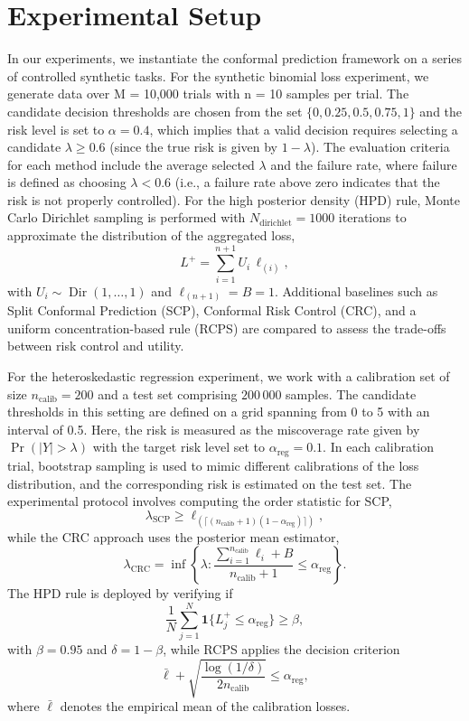 \documentclass{article}
\begin{document}
\section{Experimental Setup}
In our experiments, we instantiate the conformal prediction framework on a series of controlled synthetic tasks. For the synthetic binomial loss experiment, we generate data over M = 10,000 trials with n = 10 samples per trial. The candidate decision thresholds are chosen from the set \(\{0, 0.25, 0.5, 0.75, 1\}\) and the risk level is set to \(\alpha = 0.4\), which implies that a valid decision requires selecting a candidate \(\lambda \geq 0.6\) (since the true risk is given by \(1-\lambda\)). The evaluation criteria for each method include the average selected \(\lambda\) and the failure rate, where failure is defined as choosing \(\lambda < 0.6\) (i.e., a failure rate above zero indicates that the risk is not properly controlled). For the high posterior density (HPD) rule, Monte Carlo Dirichlet sampling is performed with \(N_{\text{dirichlet}} = 1000\) iterations to approximate the distribution of the aggregated loss,
\[
L^+ = \sum_{i=1}^{n+1} U_i \, \ell_{(i)},
\]
with \(U_i \sim \operatorname{Dir}(1,\ldots,1)\) and \(\ell_{(n+1)} = B = 1\). Additional baselines such as Split Conformal Prediction (SCP), Conformal Risk Control (CRC), and a uniform concentration-based rule (RCPS) are compared to assess the trade-offs between risk control and utility.

For the heteroskedastic regression experiment, we work with a calibration set of size \(n_{\text{calib}} = 200\) and a test set comprising \(200\,000\) samples. The candidate thresholds in this setting are defined on a grid spanning from 0 to 5 with an interval of 0.5. Here, the risk is measured as the miscoverage rate given by \(\Pr(|Y|>\lambda)\) with the target risk level set to \(\alpha_{\text{reg}} = 0.1\). In each calibration trial, bootstrap sampling is used to mimic different calibrations of the loss distribution, and the corresponding risk is estimated on the test set. The experimental protocol involves computing the order statistic for SCP,
\[
\lambda_{\text{SCP}} \geq \ell_{(\lceil (n_{\text{calib}}+1)(1-\alpha_{\text{reg}}) \rceil)},
\]
while the CRC approach uses the posterior mean estimator,
\[
\lambda_{\text{CRC}} = \inf\left\{\lambda : \frac{\sum_{i=1}^{n_{\text{calib}}} \ell_i + B}{n_{\text{calib}}+1} \le \alpha_{\text{reg}}\right\}.
\]
The HPD rule is deployed by verifying if
\[
\frac{1}{N}\sum_{j=1}^N \mathbf{1}\{L^+_j \le \alpha_{\text{reg}}\} \geq \beta,
\]
with \(\beta = 0.95\) and \(\delta = 1-\beta\), while RCPS applies the decision criterion
\[
\bar{\ell} + \sqrt{\frac{\log(1/\delta)}{2n_{\text{calib}}}} \leq \alpha_{\text{reg}},
\]
where \(\bar{\ell}\) denotes the empirical mean of the calibration losses.
\end{document}
